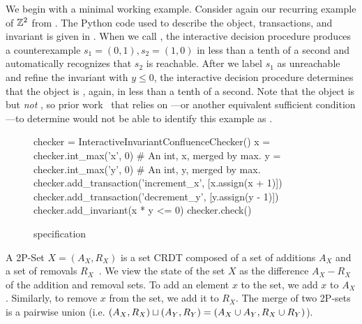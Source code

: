 {}

\example[$\ints^2$]
We begin with a minimal working example. Consider again our recurring example
of $\ints^2$ from . The Python code used to describe the object,
transactions, and invariant is given in . When we call
, the interactive decision procedure produces a
counterexample $s_1 = (0, 1), s_2 = (1, 0)$ in less than a tenth of a second
and automatically recognizes that $s_2$ is reachable. After we label $s_1$ as
unreachable and refine the invariant with $y \leq 0$, the interactive decision
procedure determines that the object is \invariantconfluent{}, again, in less
than a tenth of a second. Note that the object is \invariantconfluent{} but
\emph{not} \invariantclosed{}, so prior work~\cite{li2012making,
li2014automating, balegas2015towards, gotsman2016cause} that relies on
\invariantclosure{}---or another equivalent sufficient condition---to determine
\invariantconfluence{} would not be able to identify this example as
\invariantconfluent{}.

\begin{figure}[ht]
  \begin{Python}[gobble=4]
    checker = InteractiveInvariantConfluenceChecker()
    x = checker.int_max('x', 0) # An int, x, merged by max.
    y = checker.int_max('y', 0) # An int, y, merged by max.
    checker.add_transaction('increment_x', [x.assign(x + 1)])
    checker.add_transaction('decrement_y', [y.assign(y - 1)])
    checker.add_invariant(x * y <= 0)
    checker.check()
  \end{Python}
  \caption{ specification}
\end{figure}

A 2P-Set $X = (A_X, R_X)$ is a set CRDT composed of a set of additions $A_X$
and a set of removals $R_X$~\cite{shapiro2011comprehensive}. We view the state
of the set $X$ as the difference $A_X - R_X$ of the addition and removal sets.
To add an element $x$ to the set, we add $x$ to $A_X$. Similarly, to remove $x$
from the set, we add it to $R_X$. The merge of two 2P-sets is a pairwise union
(i.e. $(A_X, R_X) \sqcup (A_Y, R_Y) = (A_X \cup A_Y, R_X \cup R_Y)$).


